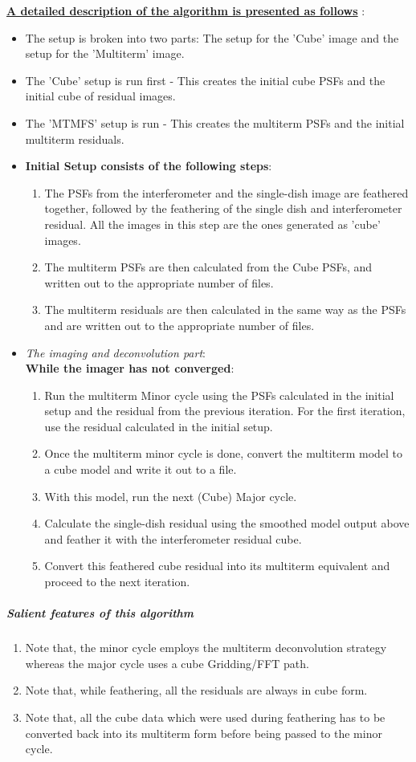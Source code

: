 \documentclass{article}
\begin{document}
\textbf{\underline{A detailed description of the algorithm is presented as follows}} : 
\begin{itemize}
\item The setup is broken into two parts: The setup for the 'Cube' image and the setup for the 'Multiterm' image.
\item The 'Cube' setup is run first - This creates the initial cube PSFs and the initial cube of residual images.
\item The 'MTMFS' setup is run - This creates the multiterm PSFs and the initial multiterm residuals.
\item \textbf{Initial Setup consists of the following steps}: 
\begin{enumerate}
\item The PSFs from the interferometer and the single-dish image are feathered together, followed by the feathering of the single dish and interferometer residual. All the images in this step are the ones generated as 'cube' images. 
\item The multiterm PSFs are then calculated from the Cube PSFs, and written out to the appropriate number of files.
\item The multiterm residuals are then calculated in the same way as the PSFs and are written out to the appropriate number of files.  
\end{enumerate}
\item \textit{The imaging and deconvolution part}:\\
\textbf{While the imager has not converged}: 
\begin{enumerate}
\item Run the multiterm Minor cycle using the PSFs calculated in the initial setup and the residual from the previous iteration. For the first iteration, use the residual calculated in the initial setup.
\item Once the multiterm minor cycle is done, convert the multiterm model to a cube model and write it out to a file.
\item With this model, run the next (Cube) Major cycle.
\item Calculate the single-dish residual using the smoothed model output above and feather it with the interferometer residual cube.
\item Convert this feathered cube residual into its multiterm equivalent and proceed to the next iteration. 
\end{enumerate} 
\end{itemize}
\subparagraph{Salient features of this algorithm}
\begin{enumerate}
\item Note that, the minor cycle employs the multiterm deconvolution strategy whereas the major cycle uses a cube Gridding/FFT path.
\item Note that, while feathering, all the residuals are always in cube form.
\item Note that, all the cube data which were used during feathering has to be converted back into its multiterm form before being passed to the minor cycle.  
\end{enumerate}
\end{document}
